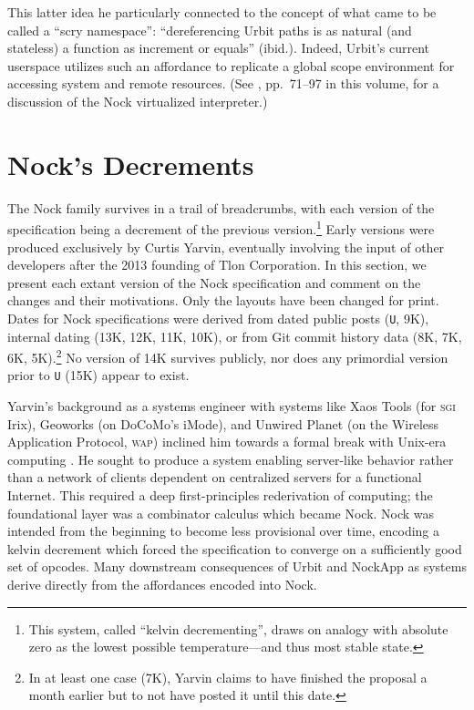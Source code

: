 \documentclass[twoside]{article}
\begin{document}
This latter idea he particularly connected to the concept of what came to be called a ``scry namespace'':  ``dereferencing Urbit paths is as natural (and stateless) a function as increment or equals'' (ibid.).  Indeed, Urbit's current userspace utilizes such an affordance to replicate a global scope environment for accessing system and remote resources.  (See , pp.~71–97 in this volume, for a discussion of the Nock virtualized interpreter.)


\section{Nock's Decrements}

The Nock family survives in a trail of breadcrumbs, with each version of the specification being a decrement of the previous version.\footnote{This system, called ``kelvin decrementing'', draws on analogy with absolute zero as the lowest possible temperature---and thus most stable state.}  Early versions were produced exclusively by Curtis Yarvin, eventually involving the input of other developers after the 2013 founding of Tlon Corporation.  In this section, we present each extant version of the Nock specification and comment on the changes and their motivations.  Only the layouts have been changed for print.  Dates for Nock specifications were derived from dated public posts (\texttt{U}, 9K), internal dating (13K, 12K, 11K, 10K), or from Git commit history data (8K, 7K, 6K, 5K).\footnote{In at least one case (7K), Yarvin claims to have finished the proposal a month earlier but to not have posted it until this date.}  No version of 14K survives publicly, nor does any primordial version prior to \texttt{U} (15K) appear to exist.

Yarvin's background as a systems engineer with systems like Xaos Tools (for \textsc{sgi} Irix), Geoworks (on DoCoMo's iMode), and Unwired Planet (on the Wireless Application Protocol, \textsc{wap}) inclined him towards a formal break with Unix-era computing \citep{Yarvin2025}.  He sought to produce a system enabling server-like behavior rather than a network of clients dependent on centralized servers for a functional Internet.  This required a deep first-principles rederivation of computing; the foundational layer was a combinator calculus which became Nock.  Nock was intended from the beginning to become less provisional over time, encoding a kelvin decrement which forced the specification to converge on a sufficiently good set of opcodes.  Many downstream consequences of Urbit and NockApp as systems derive directly from the affordances encoded into Nock.
\end{document}
